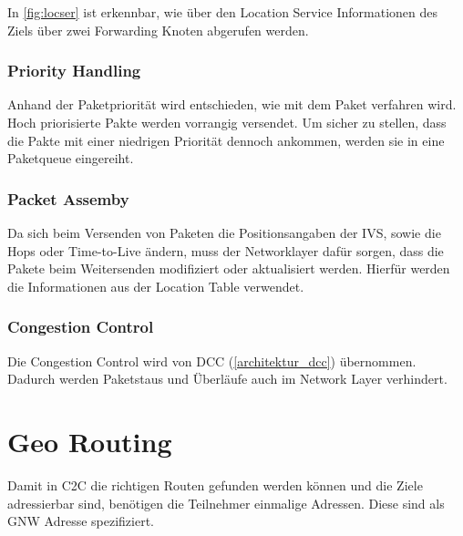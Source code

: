 In \autoref{fig:locser} ist erkennbar, wie über den Location Service Informationen des Ziels über zwei Forwarding Knoten abgerufen werden. 

\subsubsection{Priority Handling}
Anhand der Paketpriorität wird entschieden, wie mit dem Paket verfahren wird. Hoch priorisierte Pakte werden vorrangig versendet. Um sicher zu stellen, dass die Pakte mit einer niedrigen Priorität dennoch ankommen, werden sie in eine Paketqueue eingereiht. 


\subsubsection{Packet Assemby}
Da sich beim Versenden von Paketen die Positionsangaben der \ac{IVS}, sowie die Hops oder Time-to-Live ändern, muss der Networklayer dafür sorgen, dass die Pakete beim Weitersenden modifiziert oder aktualisiert werden. Hierfür werden die Informationen aus der Location Table verwendet.

\subsubsection{Congestion Control}
Die Congestion Control wird von \ac{DCC} (\autoref{architektur_dcc}) übernommen. Dadurch werden Paketstaus und Überläufe auch im Network Layer verhindert.

\section{Geo Routing\label{sec:georouting}}
Damit in \ac{C2C} die richtigen Routen gefunden werden können und die Ziele adressierbar sind, benötigen die Teilnehmer einmalige Adressen. Diese sind als \acl{GNW} Adresse spezifiziert. 

